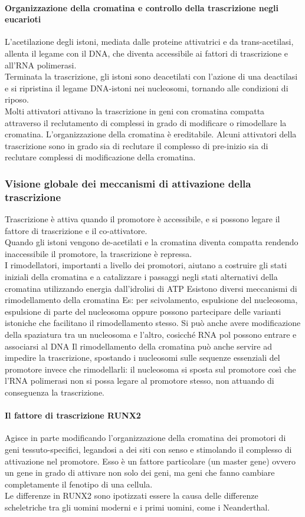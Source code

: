 \documentclass{article}
\begin{document}
\paragraph{Organizzazione della cromatina e controllo della trascrizione negli eucarioti}
L'acetilazione degli istoni, mediata dalle proteine attivatrici e da trans-acetilasi, allenta il legame con il DNA,
che diventa accessibile ai fattori di trascrizione e all'RNA polimerasi.\\
Terminata la trascrizione, gli istoni sono deacetilati con l'azione di una deactilasi e si ripristina il legame DNA-istoni nei nucleosomi, tornando alle condizioni di riposo.\\
Molti attivatori attivano la trascrizione in geni con cromatina compatta attraverso il reclutamento di complessi in grado di modificare o rimodellare la cromatina. L'organizzazione della cromatina è ereditabile. 
Alcuni attivatori della trascrizione sono in grado sia di reclutare il complesso di pre-inizio sia di reclutare complessi di modificazione della cromatina.
\subsubsection{Visione globale dei meccanismi di attivazione della trascrizione}
Trascrizione è attiva quando il promotore è accessibile, e si possono legare il fattore di trascrizione e il co-attivatore.\\
Quando gli istoni vengono de-acetilati e la cromatina diventa compatta rendendo inaccessibile il promotore, la trascrizione è repressa.\\
I rimodellatori, importanti a livello dei promotori, aiutano a costruire gli
stati iniziali della cromatina e a catalizzare i passaggi negli stati
alternativi della cromatina utilizzando energia dall'idrolisi di ATP
Esistono diversi meccanismi di rimodellamento della cromatina Es: per scivolamento, espulsione del
nucleosoma, espulsione di parte del nucleosoma oppure possono partecipare delle varianti istoniche
che facilitano il rimodellamento stesso. Si può anche avere modificazione della spaziatura tra un
nucleosoma e l'altro, cosicché RNA pol possono entrare e associarsi al DNA
Il rimodellamento della cromatina può anche servire ad impedire la trascrizione, spostando i nucleosomi
sulle sequenze essenziali del promotore invece che rimodellarli: il nucleosoma si sposta sul promotore così
che l'RNA polimerasi non si possa legare al promotore stesso, non attuando di conseguenza la trascrizione.
\paragraph{Il fattore di trascrizione RUNX2} Agisce in parte modificando l'organizzazione della cromatina dei promotori di geni tessuto-specifici, legandosi a dei siti con senso e stimolando il complesso di attivazione nel promotore. Esso è un fattore particolare (un master gene) ovvero un gene in grado di attivare non solo dei geni, ma geni che fanno cambiare completamente il fenotipo di una cellula.\\
Le differenze in RUNX2 sono ipotizzati essere la causa delle differenze scheletriche tra gli uomini moderni e i primi uomini, come i Neanderthal.
\end{document}
